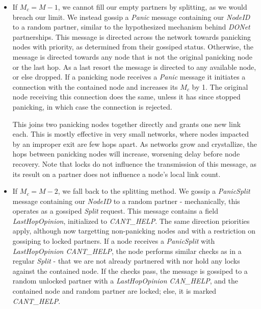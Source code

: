 \documentclass[12pt,a4paper]{article}
\begin{document}
\begin{itemize}
	\item If \(M_c = M - 1\), we cannot fill our empty partners by splitting, as we would breach our limit. We instead gossip a 
	\textit{Panic} message containing our \textit{NodeID} to a random partner, similar to the hypothesized mechanism behind \textit{DONet} partnerships. This message is directed across the network towards panicking nodes with priority, as determined from their gossiped status. Otherwise, the message is directed towards any node that is not the original panicking node or the last hop. As a last resort the message is directed to any available node, or else dropped. If a panicking node receives a \textit{Panic} message it initiates a connection with the contained node and increases its \(M_c\) by 1. The original node receiving this connection does the same, unless it has since stopped panicking, in which case the connection is rejected.
	
	This joins two panicking nodes together directly and grants one new link each. This is mostly effective in very small networks, where nodes impacted by an improper exit are few hops apart. As networks grow and crystallize, the hops between panicking nodes will increase, worsening delay before node recovery. Note that locks do not influence the transmission of this message, as its result on a partner does not influence a node's local link count.
	
	\item If \(M_c = M - 2\), we fall back to the splitting method. We gossip a \textit{PanicSplit} message containing our \textit{NodeID} to a random partner - mechanically, this operates as a gossiped \textit{Split} request. This message contains a field \textit{LastHopOpinion}, initialized to \textit{CANT\_HELP}. The same direction priorities apply, although now targetting non-panicking nodes and with a restriction on gossiping to locked partners. If a node receives a \textit{PanicSplit} with \textit{LastHopOpinion CANT\_HELP}, the node performs similar checks as in a regular \textit{Split} - that we are not already partnered with nor hold any locks against the contained node. If the checks pass, the message is gossiped to a random unlocked partner with a \textit{LastHopOpinion} \textit{CAN\_HELP}, and the contained node and random partner are locked; else, it is marked \textit{CANT\_HELP}.
	

\end{itemize}
\end{document}
